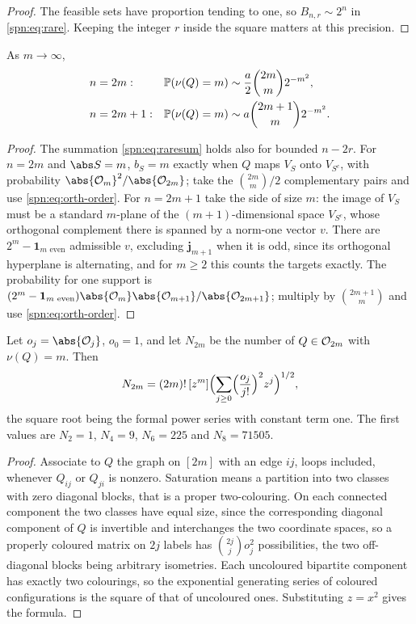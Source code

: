 \begin{proof}
The feasible sets have proportion tending to one, so $B_{n,r}\sim2^n$ in \eqref{spn:eq:rare}.
Keeping the integer $r$ inside the square matters at this precision.
\end{proof}

\begin{theorem}\label{spn:thm:saturation}
As $m\to\infty$,
\begin{align*}
 n&=2m: &\mathbb{P}(\nu(Q)=m)&\sim\frac a2\binom{2m}m2^{-m^2},\\
 n&=2m+1: &\mathbb{P}(\nu(Q)=m)&\sim a\binom{2m+1}m2^{-m^2}.
\end{align*}
\end{theorem}

\begin{proof}
The summation \eqref{spn:eq:raresum} holds also for bounded $n-2r$. For $n=2m$ and $\abs S=m$,
$b_S=m$ exactly when $Q$ maps $V_S$ onto $V_{S^c}$, with probability
$\abs{\spnOrth_m}^2/\abs{\spnOrth_{2m}}$; take the $\binom{2m}m/2$ complementary pairs and use
\eqref{spn:eq:orth-order}. For $n=2m+1$ take the side of size $m$: the image of $V_S$ must be a
standard $m$-plane of the $(m+1)$-dimensional space $V_{S^c}$, whose orthogonal complement there is
spanned by a norm-one vector $v$. There are $2^m-\mathbf 1_{m\text{ even}}$ admissible $v$,
excluding $\mathbf j_{m+1}$ when it is odd, since its orthogonal hyperplane is alternating, and
for $m\ge2$ this counts the targets exactly. The probability for one support is
$(2^m-\mathbf 1_{m\text{ even}})\abs{\spnOrth_m}\abs{\spnOrth_{m+1}}/\abs{\spnOrth_{2m+1}}$;
multiply by $\binom{2m+1}m$ and use \eqref{spn:eq:orth-order}.
\end{proof}

\begin{proposition}\label{spn:prop:saturated-count}
Let $o_j=\abs{\spnOrth_j}$, $o_0=1$, and let $N_{2m}$ be the number of $Q\in\mathcal{O}_{2m}$ with
$\nu(Q)=m$. Then
\[
 N_{2m}=(2m)!\,[z^m]\Bigl(\sum_{j\ge0}\Bigl(\frac{o_j}{j!}\Bigr)^2z^j\Bigr)^{1/2},
\]
the square root being the formal power series with constant term one. The first values are
$N_2=1$, $N_4=9$, $N_6=225$ and $N_8=71505$.
\end{proposition}

\begin{proof}
Associate to $Q$ the graph on $[2m]$ with an edge $ij$, loops included, whenever $Q_{ij}$ or
$Q_{ji}$ is nonzero. Saturation means a partition into two classes with zero diagonal blocks,
that is a proper two-colouring. On each connected component the two classes have equal size,
since the corresponding diagonal component of $Q$ is invertible and interchanges the two
coordinate spaces, so a properly coloured matrix on $2j$ labels has $\binom{2j}jo_j^2$
possibilities, the two off-diagonal blocks being arbitrary isometries. Each uncoloured bipartite
component has exactly two colourings, so the exponential generating series of coloured
configurations is the square of that of uncoloured ones. Substituting $z=x^2$ gives the formula.
\end{proof}

